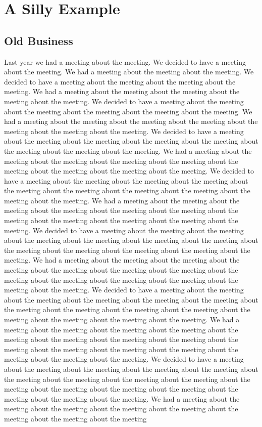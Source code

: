 \documentclass[../minutes.tex]{subfiles}
\begin{document}

\chapter{A Silly Example}
\section{Old Business}
Last year we had a meeting about the meeting.  We decided to have a meeting about the meeting.  We had a meeting about the meeting about the meeting.  We decided to have a meeting about the meeting about the meeting about the meeting.  We had a meeting about the meeting about the meeting about the meeting about the meeting.  We decided to have a meeting about the meeting about the meeting about the meeting about the meeting about the meeting.  We had a meeting about the meeting about the meeting about the meeting about the meeting about the meeting about the meeting.  We decided to have a meeting about the meeting about the meeting about the meeting about the meeting about the meeting about the meeting about the meeting.  We had a meeting about the meeting about the meeting about the meeting about the meeting about the meeting about the meeting about the meeting about the meeting.  We decided to have a meeting about the meeting about the meeting about the meeting about the meeting about the meeting about the meeting about the meeting about the meeting about the meeting.  We had a meeting about the meeting about the meeting about the meeting about the meeting about the meeting about the meeting about the meeting about the meeting about the meeting about the meeting.  We decided to have a meeting about the meeting about the meeting about the meeting about the meeting about the meeting about the meeting about the meeting about the meeting about the meeting about the meeting about the meeting.  We had a meeting about the meeting about the meeting about the meeting about the meeting about the meeting about the meeting about the meeting about the meeting about the meeting about the meeting about the meeting about the meeting.  We decided to have a meeting about the meeting about the meeting about the meeting about the meeting about the meeting about the meeting about the meeting about the meeting about the meeting about the meeting about the meeting about the meeting about the meeting.  We had a meeting about the meeting about the meeting about the meeting about the meeting about the meeting about the meeting about the meeting about the meeting about the meeting about the meeting about the meeting about the meeting about the meeting about the meeting.  We decided to have a meeting about the meeting about the meeting about the meeting about the meeting about the meeting about the meeting about the meeting about the meeting about the meeting about the meeting about the meeting about the meeting about the meeting about the meeting about the meeting.  We had a meeting about the meeting about the meeting about the meeting about the meeting about the meeting about the meeting about the meeting
\end{document}
